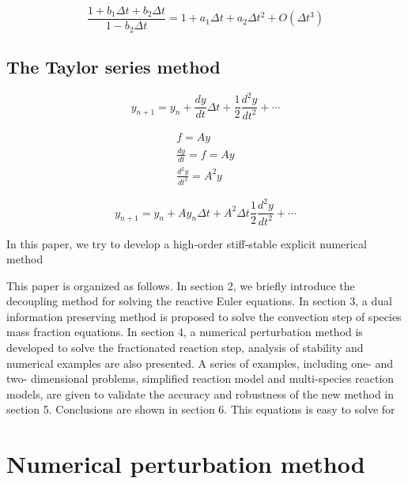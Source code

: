 \documentclass[review]{elsarticle}
\theoremstyle{plain}\newtheorem{definition}{\sc{Definition}}
\theoremstyle{defination}\newtheorem{example}{Example}[section]
\numberwithin{equation}{section}
\numberwithin{table}{section}
\begin{document}
\begin{equation}
 \frac{ 1+ b_1 \Delta t+ b_2\Delta t}{1-b_2 \Delta t}= 1+a_1 \Delta t +a_2\Delta t^2 +O(\Delta t^3)
  \end{equation}










  \subsection{The Taylor series method}

  \begin{equation}
	y_{n+1} = y_n + \frac{dy}{dt}\Delta t +\frac{1}{2} \frac{d^2y}{dt^2}+\cdots
	\end{equation}

\begin{equation}
\begin{align}
  f= Ay\\
  \frac{dy}{dt}=f=Ay\\
  \frac{d^2y}{dt^2}= A^2y 
\end{align}
  \end{equation}


  \begin{equation}
	y_{n+1} = y_n + A y_n \Delta t + A^2\Delta t \frac{1}{2} \frac{d^2y}{dt^2}+\cdots
	\end{equation}


 In this paper, we try to develop a high-order stiff-stable explicit numerical method 

This paper is organized as follows. In section 2, we briefly introduce the decoupling method for solving the reactive Euler equations. In section 3, a dual information preserving method is proposed to solve the convection step of species mass fraction equations. In section 4, a numerical perturbation method is developed to solve the fractionated reaction step, analysis of stability and numerical examples are also presented. A series of examples, including one- and two- dimensional problems, simplified reaction model and multi-species reaction models, are given to validate the accuracy and robustness of the new method in section 5. Conclusions are shown in section 6.
This equations is easy to solve for  


\section{Numerical perturbation method}
\end{document}
